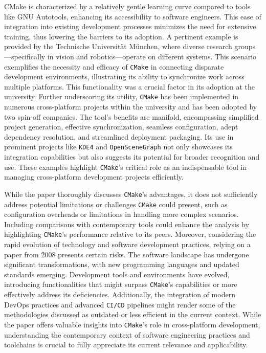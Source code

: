 CMake is characterized by a relatively gentle learning curve compared to tools like GNU Autotools, enhancing its accessibility to software engineers. This ease of integration into existing development processes minimizes the need for extensive training, thus lowering the barriers to its adoption. A pertinent example is provided by the Technische Universität München, where diverse research groups—specifically in vision and robotics—operate on different systems. This scenario exemplifies the necessity and efficacy of \texttt{CMake} in connecting disparate development environments, illustrating its ability to synchronize work across multiple platforms. This functionality was a crucial factor in its adoption at the university. Further underscoring its utility, \texttt{CMake} has been implemented in numerous cross-platform projects within the university and has been adopted by two spin-off companies. The tool's benefits are manifold, encompassing simplified project generation, effective synchronization, seamless configuration, adept dependency resolution, and streamlined deployment packaging. Its use in prominent projects like \texttt{KDE4} and \texttt{OpenSceneGraph} not only showcases its integration capabilities but also suggests its potential for broader recognition and use. These examples highlight \texttt{CMake}'s critical role as an indispensable tool in managing cross-platform development projects efficiently.

While the paper thoroughly discusses \texttt{CMake}'s advantages, it does not sufficiently address potential limitations or challenges \texttt{CMake} could present, such as configuration overheads or limitations in handling more complex scenarios. Including comparisons with contemporary tools could enhance the analysis by highlighting \texttt{CMake}'s performance relative to its peers. Moreover, considering the rapid evolution of technology and software development practices, relying on a paper from 2008 presents certain risks. The software landscape has undergone significant transformations, with new programming languages and updated standards emerging. Development tools and environments have evolved, introducing functionalities that might surpass \texttt{CMake}'s capabilities or more effectively address its deficiencies. Additionally, the integration of modern DevOps practices and advanced \texttt{CI/CD} pipelines might render some of the methodologies discussed as outdated or less efficient in the current context. While the paper offers valuable insights into \texttt{CMake}'s role in cross-platform development, understanding the contemporary context of software engineering practices and toolchains is crucial to fully appreciate its current relevance and applicability.


